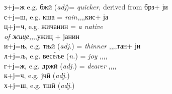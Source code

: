 \newpage

\noindent з+ј=ж e.g. бж\={и} ({\it adj})= \emph{quicker}, derived from брз\quad+ ји\\
с+ј=ш, e.g. кша \femn = \emph{rain}\qquad\qquad,,\qquad ,,\quad кис\quad+ ја\\
ц+ј=ч, e.g. жичанин \masc = \emph{a native}\\
\hspace*{0.42\linewidth} \emph{of жице},,\qquad ,,\quad ужиц + јанин\\
и+ј=њ, e.g. тњ\={и} ({\it adj.}) = \emph{thinner} \quad ,,\qquad ,,\quad тан\quad + ји\\
л+ј=љ, e.g. вес\'{е}ље ({\it n.}) = \emph{joy} \quad\qquad,,\qquad ,,\quad \\
г+ј=ж, e.g. држ\={и} ({\it adj.}) = \emph{dearer} \quad,,\qquad ,,\quad\\
к+ј=ч, e.g. јч\={и} ({\it adj.})\\
х+ј=ш, e.g. тш\={и} ({\it adj.})\\

